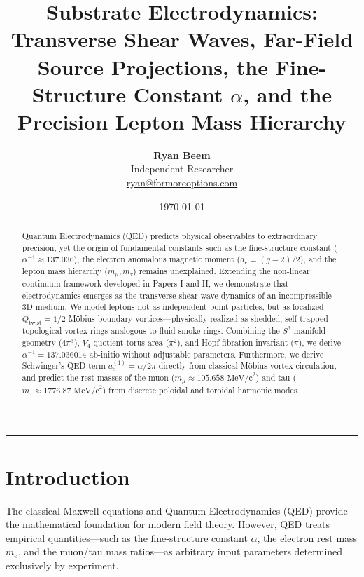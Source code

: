 \documentclass[11pt,a4paper]{article}
\title{\Large\bfseries Substrate Electrodynamics: Transverse Shear Waves, Far-Field Source Projections, the Fine-Structure Constant $\alpha$, and the Precision Lepton Mass Hierarchy}
\author{
	\textbf{Ryan Beem}\\[0.5em]
	\small Independent Researcher \\
	\small \href{mailto:ryan@formoreoptions.com}{ryan@formoreoptions.com}
}
\date{\today}
\begin{document}
	
	\maketitle
	
	\begin{abstract}
		Quantum Electrodynamics (QED) predicts physical observables to extraordinary precision, yet the origin of fundamental constants such as the fine-structure constant ($\alpha^{-1} \approx 137.036$), the electron anomalous magnetic moment ($a_e = (g-2)/2$), and the lepton mass hierarchy ($m_\mu, m_\tau$) remains unexplained. Extending the non-linear continuum framework developed in Papers I and II, we demonstrate that electrodynamics emerges as the transverse shear wave dynamics of an incompressible 3D medium. We model leptons not as independent point particles, but as localized $Q_{\text{twist}} = 1/2$ Möbius boundary vortices—physically realized as shedded, self-trapped topological vortex rings analogous to fluid smoke rings. Combining the $S^3$ manifold geometry ($4\pi^3$), $V_4$ quotient torus area ($\pi^2$), and Hopf fibration invariant ($\pi$), we derive $\alpha^{-1} = 137.036014$ ab-initio without adjustable parameters. Furthermore, we derive Schwinger's QED term $a_e^{(1)} = \alpha/2\pi$ directly from classical Möbius vortex circulation, and predict the rest masses of the muon ($m_\mu \approx 105.658 \text{ MeV/c}^2$) and tau ($m_\tau \approx 1776.87 \text{ MeV/c}^2$) from discrete poloidal and toroidal harmonic modes.
	\end{abstract}
	
	\vspace{1em}
	\hrule
	\vspace{1.5em}
	
	\section{Introduction}
	\label{sec:intro}
	
	The classical Maxwell equations and Quantum Electrodynamics (QED) provide the mathematical foundation for modern field theory. However, QED treats empirical quantities—such as the fine-structure constant $\alpha$, the electron rest mass $m_e$, and the muon/tau mass ratios—as arbitrary input parameters determined exclusively by experiment.
	
\end{document}
